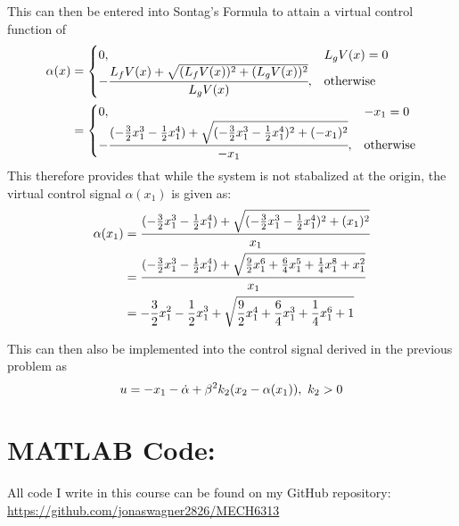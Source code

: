 \documentclass[letter]{article}
\begin{document}
This can then be entered into Sontag's Formula to attain a virtual control function of
\begin{align}
	\alpha(x) 
	&=
	\begin{cases}
		0,	& L_g V(x) = 0\\
		-\cfrac{L_f V(x) + \sqrt{(L_f V(x))^2 + (L_g V(x))^2}}{L_g V(x)}, &\text{otherwise}
	\end{cases}\\
	&=
	\begin{cases}
		0,	& - x_1 = 0\\
		-\cfrac{(-\frac{3}{2} x_1^3 - \frac{1}{2} x_1^4) + \sqrt{(-\frac{3}{2} x_1^3 - \frac{1}{2} x_1^4)^2 + (- x_1)^2}}{- x_1}, &\text{otherwise}
	\end{cases}
\end{align}
This therefore provides that while the system is not stabalized at the origin, the virtual control signal $\alpha(x_1)$ is given as:
\begin{align}
	\alpha(x_1) 
	&= \cfrac{(-\frac{3}{2} x_1^3 - \frac{1}{2} x_1^4) + \sqrt{(-\frac{3}{2} x_1^3 - \frac{1}{2} x_1^4)^2 + (x_1)^2}}{x_1}\\
	&= \cfrac{(-\frac{3}{2} x_1^3 - \frac{1}{2} x_1^4) + \sqrt{\frac{9}{2} x_1^6 + \frac{6}{4} x_1^5 + \frac{1}{4} x_1^8 + x_1^2}}{x_1}\\
	&= -\frac{3}{2} x_1^2 - \frac{1}{2} x_1^3 + \sqrt{\frac{9}{2} x_1^4 + \frac{6}{4} x_1^3 + \frac{1}{4} x_1^6 + 1}
\end{align}

This can then also be implemented into the control signal derived in the previous problem as
\begin{equation}
	u = -x_1 - \dot{\alpha} + \beta^2 k_2 \qty(x_2 - \alpha(x_1)), \ k_2 > 0
\end{equation}

\newpage
\appendix
\section{MATLAB Code:}\label{apx:matlab}
All code I write in this course can be found on my GitHub repository:\\
\href{https://github.com/jonaswagner2826/MECH6313}{https://github.com/jonaswagner2826/MECH6313}
%
\end{document}
